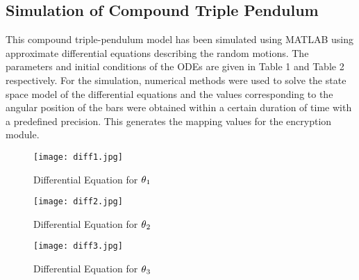 \subsection{Simulation of Compound Triple Pendulum}
This compound triple-pendulum model has been simulated using MATLAB using approximate differential equations describing the random motions. The parameters and initial conditions of the ODEs are given in Table 1 and Table 2 respectively. For the simulation, numerical methods were used to solve the state space model of the differential equations and the values corresponding to the angular position of the bars were obtained within a certain duration of time with a predefined precision. This generates the mapping values for the encryption module.

\begin{figure}[H]
\centering
\texttt{[image: diff1.jpg]}
\caption{Differential Equation for ${\theta\textsubscript{1}}$}\label{fig:diff1}
\end{figure}


\begin{figure}[H]
\centering
\texttt{[image: diff2.jpg]}
\caption{Differential Equation for ${\theta\textsubscript{2}}$}\label{fig:diff2}
\end{figure}


\begin{figure}[H]
\centering
\texttt{[image: diff3.jpg]}
\caption{Differential Equation for ${\theta\textsubscript{3}}$}\label{fig:diff3}
\end{figure}
\vfill

